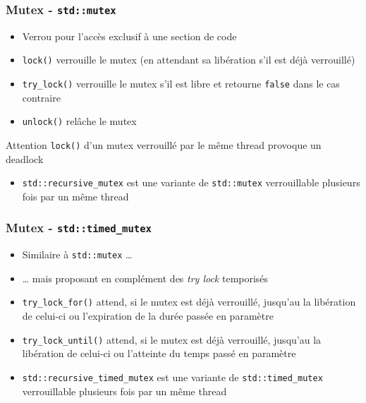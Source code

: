 \documentclass[C++.tex]{subfiles}
\begin{document}
\begin{frame}[fragile]
	\frametitle{Mutex - \lstinline|std::mutex|}
	\begin{itemize}
		\item Verrou pour l'accès exclusif à une section de code
		\item \lstinline|lock()| verrouille le mutex (en attendant sa libération s'il est déjà verrouillé)
		\item \lstinline|try_lock()| verrouille le mutex s'il est libre et retourne \lstinline|false| dans le cas contraire
		\item \lstinline|unlock()| relâche le mutex
	\end{itemize}

	\begin{alertblock}{Attention}
		\lstinline|lock()| d'un mutex verrouillé par le même thread provoque un deadlock
	\end{alertblock}

	\begin{itemize}
		\item \lstinline|std::recursive_mutex| est une variante de \lstinline|std::mutex| verrouillable plusieurs fois par un même thread

	\end{itemize}
\end{frame}

\begin{frame}[fragile]
	\frametitle{Mutex - \lstinline|std::timed_mutex|}
	\begin{itemize}
		\item Similaire à \lstinline|std::mutex| \ldots
		\item \ldots{} mais proposant en complément des \textit{try lock} temporisés
		\item \lstinline|try_lock_for()| attend, si le mutex est déjà verrouillé, jusqu'au la libération de celui-ci ou l'expiration de la durée passée en paramètre
		\item \lstinline|try_lock_until()| attend, si le mutex est déjà verrouillé, jusqu'au la libération de celui-ci ou l'atteinte du temps passé en paramètre
		\item \lstinline|std::recursive_timed_mutex| est une variante de \lstinline|std::timed_mutex| verrouillable plusieurs fois par un même thread
	\end{itemize}
\end{frame}
\end{document}
